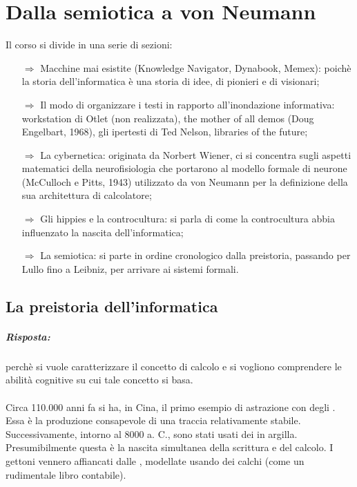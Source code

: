\chapter{Dalla semiotica a von Neumann}

Il corso si divide in una serie di sezioni:
\begin{itemize}
    \item [$\Rightarrow$] Macchine mai esistite (Knowledge
    Navigator, Dynabook, Memex): poichè la storia dell'informatica
    è una storia di idee, di pionieri e di visionari;
    \item [$\Rightarrow$] Il modo di organizzare i testi in rapporto all'inondazione 
    informativa: workstation di Otlet (non realizzata), the mother of all
    demos (Doug Engelbart, 1968), gli ipertesti di Ted Nelson, libraries
    of the future;
    \item [$\Rightarrow$] La cybernetica: originata da Norbert Wiener, ci si concentra sugli
    aspetti matematici della neurofisiologia che portarono al modello formale di
    neurone (McCulloch e Pitts, 1943) utilizzato da von Neumann per la
    definizione della sua architettura di calcolatore;
    \item [$\Rightarrow$] Gli hippies e la controcultura: si parla di come la controcultura 
    abbia influenzato la nascita dell'informatica;
    \item [$\Rightarrow$] La semiotica: si parte in ordine cronologico dalla preistoria, passando per Lullo fino
    a Leibniz, per arrivare ai sistemi formali.
\end{itemize}

\section{La preistoria dell'informatica}


\paragraph{Risposta:} perchè si vuole caratterizzare il
concetto di calcolo e si vogliono comprendere le abilità cognitive
su cui tale concetto si basa.

\subsubsection{}

Circa 110.000 anni fa si ha, in Cina, il primo esempio di astrazione con degli . Essa è la produzione consapevole di una traccia relativamente stabile. Successivamente, intorno al 8000 a. C., sono stati usati dei  in argilla. Presumibilmente questa è la nascita simultanea della scrittura e del calcolo. I gettoni vennero affiancati dalle , modellate usando dei calchi (come un rudimentale libro contabile).

